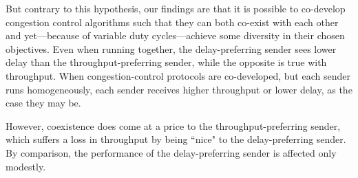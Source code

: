 But contrary to this hypothesis, our findings are that it is possible
to co-develop congestion control algorithms such that they can both
co-exist with each other and yet---because of variable duty
cycles---achieve some diversity in their chosen objectives.  Even when
running together, the delay-preferring sender sees lower delay than
the throughput-preferring sender, while the opposite is true with
throughput. When congestion-control protocols are co-developed, but
each sender runs homogeneously, each sender receives higher throughput
or lower delay, as the case they may be.

However, coexistence does come at a price to the throughput-preferring
sender, which suffers a loss in throughput by being ``nice" to the
delay-preferring sender. By comparison, the performance of the
delay-preferring sender is affected only modestly.
